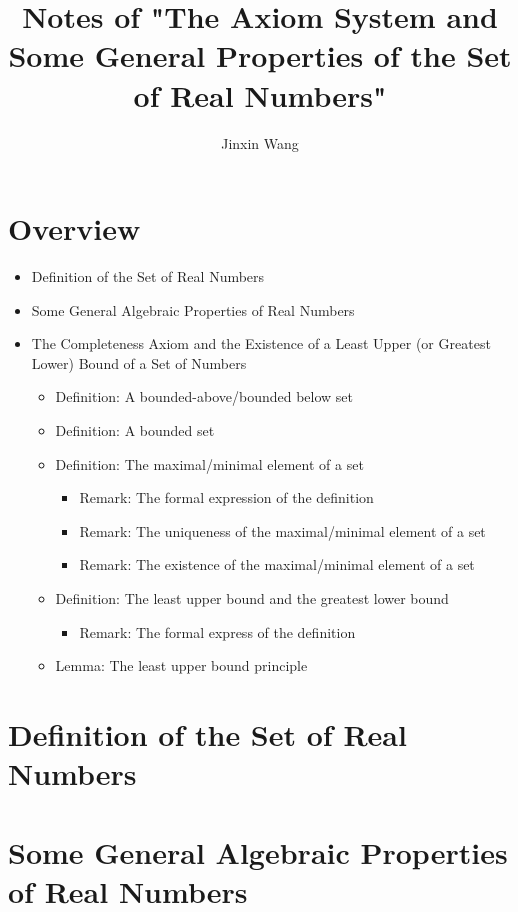 \documentclass[onecolumn]{ctexart}
\title{Notes of "The Axiom System and Some General Properties of the Set of Real Numbers"}
\author{Jinxin Wang}
\date{}
\begin{document}
\maketitle

\section{Overview}
\begin{itemize}
  \item Definition of the Set of Real Numbers
  \item Some General Algebraic Properties of Real Numbers
  \item The Completeness Axiom and the Existence of a Least Upper (or Greatest Lower) Bound of a Set of Numbers
  \begin{itemize}
    \item Definition: A bounded-above/bounded below set
    \item Definition: A bounded set
    \item Definition: The maximal/minimal element of a set
    \begin{itemize}
      \item Remark: The formal expression of the definition
      \item Remark: The uniqueness of the maximal/minimal element of a set
      \item Remark: The existence of the maximal/minimal element of a set
    \end{itemize}
    \item Definition: The least upper bound and the greatest lower bound
    \begin{itemize}
      \item Remark: The formal express of the definition
    \end{itemize}
    \item Lemma: The least upper bound principle
  \end{itemize}
\end{itemize}

\section{Definition of the Set of Real Numbers}

\section{Some General Algebraic Properties of Real Numbers}
\end{document}
